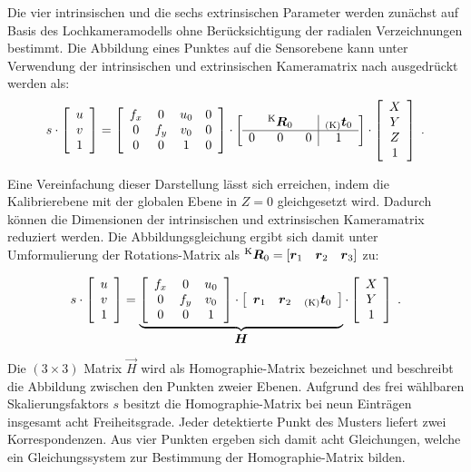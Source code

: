 Die vier intrinsischen und die sechs extrinsischen Parameter werden zunächst auf Basis des Lochkameramodells ohne Berücksichtigung der radialen Verzeichnungen bestimmt. Die Abbildung eines Punktes auf die Sensorebene kann unter Verwendung der intrinsischen und extrinsischen Kameramatrix nach  ausgedrückt werden als:
%
\begin{equation}
s \cdot 
\mat{c}{
u\\
v\\
1
}
=
\mat{cccc}{
f_x & 0 & u_\ind{0} & 0\\
0 & f_y & v_\ind{0} & 0\\
0 & 0 & 1 & 0
}
\cdot
\mat{ccc|c}{
  & \rmat{K}{0} &   & \ve{K}{t}_{\ind{0}} \\
\hline
0 &      0      & 0 & 1 \\
}
\cdot
\mat{c}{
X\\
Y\\
Z\\
1
} \; \text{.}
\end{equation}

Eine Vereinfachung dieser Darstellung lässt sich erreichen, indem die Kalibrierebene mit der globalen Ebene in $Z=0$ gleichgesetzt wird. Dadurch können die Dimensionen der intrinsischen und extrinsischen Kameramatrix reduziert werden. Die Abbildungsgleichung ergibt sich damit unter Umformulierung der Rotations-Matrix als $\rmat{K}{0} = [\vec{r}_1 \quad \vec{r}_2 \quad \vec{r}_3]$ zu:

%
\begin{equation}
s \cdot
\mat{c}{
u\\
v\\
1
}
 = 
\underbrace{
\mat{ccc}{ 
	f_x & 0 & u_\ind{0}\\
	0 & f_y & v_\ind{0}\\
	0 & 0 & 1
}
\cdot
\mat{ccc}{ 
	\vec{r}_1 & \vec{r}_2 & \ve{K}{t}_{\ind{0}} \\
}
}_{\vec{H}}
\cdot
\mat{c}{
	X\\
	Y\\
	1
} \; \text{.}
\end{equation}



Die $(3 \times 3)$ Matrix $\vec{H}$ wird als Homographie-Matrix bezeichnet und beschreibt die Abbildung zwischen den Punkten zweier Ebenen. Aufgrund des frei wählbaren Skalierungsfaktors $s$ besitzt die Homographie-Matrix bei neun Einträgen insgesamt acht Freiheitsgrade. Jeder detektierte Punkt des Musters liefert zwei Korrespondenzen. Aus vier Punkten ergeben sich damit acht Gleichungen, welche ein Gleichungssystem zur Bestimmung der Homographie-Matrix bilden.\\

